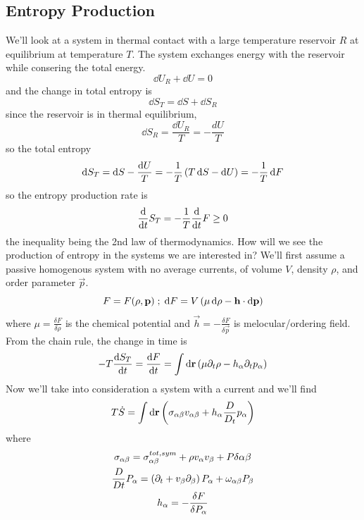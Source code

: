 \subsection{Entropy Production}
We'll look at a system in thermal contact with a large temperature reservoir \(R\) at equilibrium at temperature \(T\). The system exchanges energy with the reservoir while consering the total energy.
\begin{equation}
    \dd U_R + \dd U = 0
\end{equation}
and the change in total entropy is
\begin{equation}
    \dd S_T = \dd S + \dd S_R
\end{equation}
since the reservoir is in thermal equilibrium,
\begin{equation}
    \dd S_R = \frac{\dd U_R}{T} = -\frac{dU}{T}
\end{equation}
so the total entropy
\begin{equation}
    \mathop{}\!\mathrm{d} S_T = \mathop{}\!\mathrm{d} S - \frac{\mathop{}\!\mathrm{d} U}{T} = -\frac{1}{T}\left(T\mathop{}\!\mathrm{d} S-\mathop{}\!\mathrm{d} U\right) = -\frac{1}{T}\mathop{}\!\mathrm{d} F
\end{equation}
so the entropy production rate is
\begin{equation}
    \diff*{S_T}{t} = -\frac{1}{T}\diff*{F}{t} \geq 0
\end{equation}
the inequality being the 2nd law of thermodynamics. How will we see the production of entropy in the systems we are interested in? We'll first assume a passive homogenous system with no average currents, of volume \(V\), density \(\rho\), and order parameter \(\vec{p}\).
\begin{equation}
    F = F(\rho, \mathbf{p}) \; ; \; \mathop{}\!\mathrm{d} F = V \left(\mu\mathop{}\!\mathrm{d} \rho - \mathbf{h}\cdot\mathop{}\!\mathrm{d}\mathbf{p}\right)
\end{equation}
where \(\mu = \frac{\delta F}{\delta \rho}\) is the chemical potential and \(\vec{h} = -\frac{\delta F}{\delta \vec{p}}\) is melocular/ordering field. From the chain rule, the change in time is
\begin{equation}
    -T\diff{S_T}{t} = \diff{F}{t} = \int\dd\vec{r} \ins{\mu\del_t\rho - h_\alpha\del_t p_\alpha}
\end{equation}
Now we'll take into consideration a system with a current and we'll find
\begin{equation}
    T\dot{S} = \int \mathop{}\!\mathrm{d}\mathbf{r} \left(\sigma_{\alpha\beta} v_{\alpha\beta} +h_\alpha \frac{D}{D_t}p_\alpha\right)
\end{equation}
where
\begin{gather}
    \sigma_{\alpha\beta} = \sigma_{\alpha\beta}^{tot, sym} + \rho v_\alpha v_\beta + P\delta{\alpha\beta} \\
    \frac{D}{Dt} P_\alpha = \left(\partial_t+v_\beta\partial_\beta\right)P_\alpha + \omega_{\alpha\beta}P_\beta \\
    h_\alpha = -\frac{\delta F}{\delta P_\alpha}
\end{gather}

